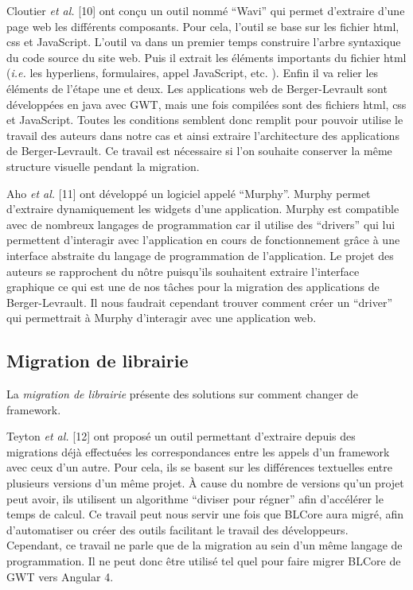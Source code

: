 \documentclass[11pt,]{article}
\begin{document}
Cloutier \emph{et al.} {[}10{]} ont conçu un outil nommé ``Wavi'' qui
permet d'extraire d'une page web les différents composants. Pour cela,
l'outil se base sur les fichier html, css et JavaScript. L'outil va dans
un premier temps construire l'arbre syntaxique du code source du site
web. Puis il extrait les éléments importants du fichier html
(\emph{i.e.} les hyperliens, formulaires, appel JavaScript, etc. ).
Enfin il va relier les éléments de l'étape une et deux. Les applications
web de Berger-Levrault sont développées en java avec GWT, mais une fois
compilées sont des fichiers html, css et JavaScript. Toutes les
conditions semblent donc remplit pour pouvoir utilise le travail des
auteurs dans notre cas et ainsi extraire l'architecture des applications
de Berger-Levrault. Ce travail est nécessaire si l'on souhaite conserver
la même structure visuelle pendant la migration.

Aho \emph{et al.} {[}11{]} ont développé un logiciel appelé ``Murphy''.
Murphy permet d'extraire dynamiquement les widgets d'une application.
Murphy est compatible avec de nombreux langages de programmation car il
utilise des ``drivers'' qui lui permettent d'interagir avec
l'application en cours de fonctionnement grâce à une interface abstraite
du langage de programmation de l'application. Le projet des auteurs se
rapprochent du nôtre puisqu'ils souhaitent extraire l'interface
graphique ce qui est une de nos tâches pour la migration des
applications de Berger-Levrault. Il nous faudrait cependant trouver
comment créer un ``driver'' qui permettrait à Murphy d'interagir avec
une application web.

\hypertarget{migration-de-librairie}{%
\subsection{Migration de librairie}\label{migration-de-librairie}}

La \emph{migration de librairie} présente des solutions sur comment
changer de framework.

Teyton \emph{et al.} {[}12{]} ont proposé un outil permettant d'extraire
depuis des migrations déjà effectuées les correspondances entre les
appels d'un framework avec ceux d'un autre. Pour cela, ils se basent sur
les différences textuelles entre plusieurs versions d'un même projet. À
cause du nombre de versions qu'un projet peut avoir, ils utilisent un
algorithme ``diviser pour régner'' afin d'accélérer le temps de calcul.
Ce travail peut nous servir une fois que BLCore aura migré, afin
d'automatiser ou créer des outils facilitant le travail des
développeurs. Cependant, ce travail ne parle que de la migration au sein
d'un même langage de programmation. Il ne peut donc être utilisé tel
quel pour faire migrer BLCore de GWT vers Angular 4.
\end{document}
